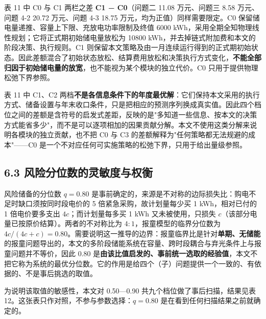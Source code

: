 \documentclass[12pt,a4paper]{ctexart}
\begin{document}
表 11 中 C0 与 C1 两栏之差 \textbf{C1 − C0}（问题二 11.08 万元、问题三 8.58 万元、问题 4-2 20.72 万元、问题 4-3 18.75 万元，均为正值）同样需要限定。C0 保留储电量递推、容量上下限、充放电功率限制及终值 6000 kWh，采用全期全知物理线性规划；它将正式期初始储电量放松为 10800 kWh，并去掉链式附加费和本文的阶段决策、执行规则。C1 则保留本文策略及由一月连续运行得到的正式期初始状态。因此差额混合了初始状态放松、结算费用放松和决策执行方式变化，\textbf{不能全部归因于初始储电量的放宽}，也不能视为某个模块的独立代价。C0 只用于提供物理松弛下界参照。

表 11 中 C1、C2 两档\textbf{不是各信息条件下的年度最优解}：它们保持本文采用的执行方式、储备设置与年末收口条件，只是把相应的预测序列换成真实值。因此四个档位之间的差额是含符号的启发式差距，反映的是"多知道一些信息、按本文的决策方式能省多少"，而不是可以逐项相加的因果贡献分解。本文不使用这类分解来说明各模块的独立贡献，也不把 C0 与 C3 的差额解释为"任何策略都无法规避的成本"——C0 是一个不对应任何可实施策略的松弛下界，只用于给出量级参照。

\subsection*{6.3 风险分位数的灵敏度与权衡}

风险储备的分位数 $q=0.80$ 是事前确定的，来源是不对称的边际损失比：购电不足时缺口须按同时段电价的 5 倍紧急采购，故计划量每少买 1 kWh，相对已付的 1 倍电价要多支出 $4c$；而计划量每多买 1 kWh 又未被使用，只损失 $c$（该部分电量已按原价结算）。两者的不对称比为 $4:1$，报童模型的临界分位数为 $4c/(4c+c)=0.80$。需要说明这一推导的边界：报童临界比是针对\textbf{单期、无储能}的报童问题导出的，本文的多阶段储能系统在容量、跨时段耦合与弃光条件上与报童问题并不等价，因此 0.80 是\textbf{由该比值启发的、事前统一选取的经验值}，本文不把它称为系统的最优分位数。它的作用是给四个（子）问题提供一个一致的、有依据的、不是事后挑选的取值。

为说明该取值的敏感性，本文对 0.50—0.90 共九个档位做了事后扫描，结果见表 12。这张表只作对照，不参与参数选择：$q=0.80$ 是在看到任何扫描结果之前就确定的。
\end{document}
